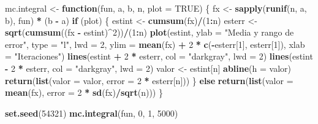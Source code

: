 \documentclass[]{book}
\newenvironment{Shaded}{\begin{snugshade}}{\end{snugshade}}
\newcommand{\KeywordTok}[1]{\textcolor[rgb]{0.13,0.29,0.53}{\textbf{#1}}}
\newcommand{\DataTypeTok}[1]{\textcolor[rgb]{0.13,0.29,0.53}{#1}}
\newcommand{\DecValTok}[1]{\textcolor[rgb]{0.00,0.00,0.81}{#1}}
\newcommand{\StringTok}[1]{\textcolor[rgb]{0.31,0.60,0.02}{#1}}
\newcommand{\OtherTok}[1]{\textcolor[rgb]{0.56,0.35,0.01}{#1}}
\newcommand{\ControlFlowTok}[1]{\textcolor[rgb]{0.13,0.29,0.53}{\textbf{#1}}}
\newcommand{\OperatorTok}[1]{\textcolor[rgb]{0.81,0.36,0.00}{\textbf{#1}}}
\newcommand{\NormalTok}[1]{#1}
\theoremstyle{definition}
\theoremstyle{definition}
\theoremstyle{definition}
\theoremstyle{remark}
\begin{document}
\begin{Shaded}
\begin{Highlighting}[]
\NormalTok{  mc.integral <-}\StringTok{ }\ControlFlowTok{function}\NormalTok{(fun, a, b, n, }\DataTypeTok{plot =} \OtherTok{TRUE}\NormalTok{) \{}
\NormalTok{    fx <-}\StringTok{ }\KeywordTok{sapply}\NormalTok{(}\KeywordTok{runif}\NormalTok{(n, a, b), fun) }\OperatorTok{*}\StringTok{ }\NormalTok{(b }\OperatorTok{-}\StringTok{ }\NormalTok{a)}
    \ControlFlowTok{if}\NormalTok{ (plot) \{}
\NormalTok{      estint <-}\StringTok{ }\KeywordTok{cumsum}\NormalTok{(fx)}\OperatorTok{/}\NormalTok{(}\DecValTok{1}\OperatorTok{:}\NormalTok{n)}
\NormalTok{      esterr <-}\StringTok{ }\KeywordTok{sqrt}\NormalTok{(}\KeywordTok{cumsum}\NormalTok{((fx }\OperatorTok{-}\StringTok{ }\NormalTok{estint)}\OperatorTok{^}\DecValTok{2}\NormalTok{))}\OperatorTok{/}\NormalTok{(}\DecValTok{1}\OperatorTok{:}\NormalTok{n)}
      \KeywordTok{plot}\NormalTok{(estint, }\DataTypeTok{ylab =} \StringTok{"Media y rango de error"}\NormalTok{, }\DataTypeTok{type =} \StringTok{"l"}\NormalTok{, }\DataTypeTok{lwd =} \DecValTok{2}\NormalTok{, }\DataTypeTok{ylim =} \KeywordTok{mean}\NormalTok{(fx) }\OperatorTok{+}\StringTok{ }
\StringTok{             }\DecValTok{2} \OperatorTok{*}\StringTok{ }\KeywordTok{c}\NormalTok{(}\OperatorTok{-}\NormalTok{esterr[}\DecValTok{1}\NormalTok{], esterr[}\DecValTok{1}\NormalTok{]), }\DataTypeTok{xlab =} \StringTok{"Iteraciones"}\NormalTok{)}
      \KeywordTok{lines}\NormalTok{(estint }\OperatorTok{+}\StringTok{ }\DecValTok{2} \OperatorTok{*}\StringTok{ }\NormalTok{esterr, }\DataTypeTok{col =} \StringTok{"darkgray"}\NormalTok{, }\DataTypeTok{lwd =} \DecValTok{2}\NormalTok{)}
      \KeywordTok{lines}\NormalTok{(estint }\OperatorTok{-}\StringTok{ }\DecValTok{2} \OperatorTok{*}\StringTok{ }\NormalTok{esterr, }\DataTypeTok{col =} \StringTok{"darkgray"}\NormalTok{, }\DataTypeTok{lwd =} \DecValTok{2}\NormalTok{)}
\NormalTok{      valor <-}\StringTok{ }\NormalTok{estint[n]}
      \KeywordTok{abline}\NormalTok{(}\DataTypeTok{h =}\NormalTok{ valor)}
      \KeywordTok{return}\NormalTok{(}\KeywordTok{list}\NormalTok{(}\DataTypeTok{valor =}\NormalTok{ valor, }\DataTypeTok{error =} \DecValTok{2} \OperatorTok{*}\StringTok{ }\NormalTok{esterr[n]))}
\NormalTok{    \} }\ControlFlowTok{else} \KeywordTok{return}\NormalTok{(}\KeywordTok{list}\NormalTok{(}\DataTypeTok{valor =} \KeywordTok{mean}\NormalTok{(fx), }\DataTypeTok{error =} \DecValTok{2} \OperatorTok{*}\StringTok{ }\KeywordTok{sd}\NormalTok{(fx)}\OperatorTok{/}\KeywordTok{sqrt}\NormalTok{(n)))}
\NormalTok{  \}}

\KeywordTok{set.seed}\NormalTok{(}\DecValTok{54321}\NormalTok{)}
\KeywordTok{mc.integral}\NormalTok{(fun, }\DecValTok{0}\NormalTok{, }\DecValTok{1}\NormalTok{, }\DecValTok{5000}\NormalTok{)}
\end{Highlighting}
\end{Shaded}
\end{document}
